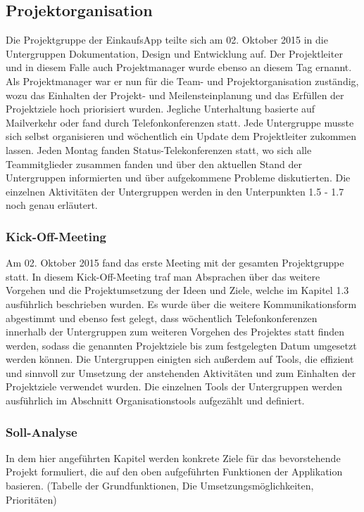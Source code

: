 \documentclass[12pt,a4paper]{article}
\begin{document}
\newpage
\subsection{Projektorganisation}
Die Projektgruppe der EinkaufsApp teilte sich am 02. Oktober 2015 in die Untergruppen Dokumentation, Design und Entwicklung auf.
Der Projektleiter und in diesem Falle auch Projektmanager wurde ebenso an diesem Tag ernannt.
Als Projektmanager war er nun für die Team- und Projektorganisation zuständig, wozu das Einhalten der Projekt- und Meilensteinplanung  und das Erfüllen der Projektziele hoch priorisiert wurden.
Jegliche Unterhaltung basierte auf Mailverkehr oder fand durch Telefonkonferenzen statt. Jede Untergruppe musste sich selbst organisieren und wöchentlich ein Update dem Projektleiter zukommen lassen. Jeden Montag fanden Status-Telekonferenzen statt, wo sich alle Teammitglieder zusammen fanden und über den aktuellen Stand der Untergruppen informierten und über aufgekommene Probleme diskutierten. Die einzelnen Aktivitäten der Untergruppen werden in den Unterpunkten  1.5 - 1.7 noch genau erläutert.


\subsubsection{Kick-Off-Meeting}
Am 02. Oktober  2015 fand das erste Meeting mit der gesamten Projektgruppe statt. In diesem Kick-Off-Meeting traf man Absprachen über das weitere Vorgehen und die Projektumsetzung der Ideen und Ziele, welche im Kapitel 1.3 ausführlich beschrieben wurden. Es wurde über die weitere Kommunikationsform abgestimmt und ebenso fest gelegt, dass wöchentlich Telefonkonferenzen innerhalb der Untergruppen zum weiteren Vorgehen des Projektes statt finden werden, sodass die genannten Projektziele bis zum festgelegten Datum umgesetzt werden können. 
Die Untergruppen einigten sich außerdem auf Tools, die effizient und sinnvoll zur Umsetzung der anstehenden Aktivitäten und zum Einhalten der Projektziele verwendet wurden. Die einzelnen Tools der Untergruppen werden ausführlich im Abschnitt Organisationstools aufgezählt und definiert.
\newpage

\subsubsection{Soll-Analyse}
In dem hier angeführten Kapitel werden konkrete Ziele für das bevorstehende Projekt formuliert, die auf den oben aufgeführten Funktionen der Applikation basieren. (Tabelle der Grundfunktionen, Die Umsetzungsmöglichkeiten, Prioritäten)
\end{document}

